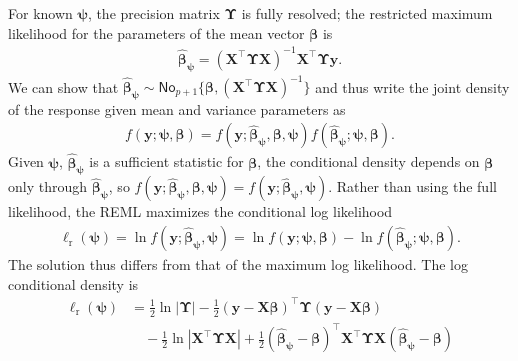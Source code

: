 \documentclass[
  11pt,
  letterpaper,
]{book}
\theoremstyle{definition}
\theoremstyle{definition}
\theoremstyle{definition}
\theoremstyle{definition}
\theoremstyle{remark}
\begin{document}
For known \(\boldsymbol{\psi}\), the precision matrix \(\boldsymbol{\Upsilon}\) is fully resolved; the restricted maximum likelihood for the parameters of the mean vector \(\boldsymbol{\beta}\) is
\begin{align*}
\widehat{\boldsymbol{\beta}}_{\boldsymbol{\psi}} = (\mathbf{X}^\top\boldsymbol{\Upsilon}\mathbf{X})^{-1}\mathbf{X}^\top\boldsymbol{\Upsilon}\boldsymbol{y}.
\end{align*}
We can show that \(\widehat{\boldsymbol{\beta}}_{\boldsymbol{\psi}} \sim \mathsf{No}_{p+1}\{\boldsymbol{\beta}, (\mathbf{X}^\top\boldsymbol{\Upsilon}\mathbf{X})^{-1}\}\) and thus write the joint density of the response given mean and variance parameters as
\begin{align*}
f(\boldsymbol{y}; \boldsymbol{\psi}, \boldsymbol{\beta}) = f(\boldsymbol{y}; \widehat{\boldsymbol{\beta}}_{\boldsymbol{\psi}}, \boldsymbol{\beta}, \boldsymbol{\psi}) f(\widehat{\boldsymbol{\beta}}_{\boldsymbol{\psi}}; \boldsymbol{\psi}, \boldsymbol{\beta}).
\end{align*}
Given \(\boldsymbol{\psi}\), \(\widehat{\boldsymbol{\beta}}_{\boldsymbol{\psi}}\) is a sufficient statistic for \(\boldsymbol{\beta}\), the conditional density depends on \(\boldsymbol{\beta}\) only through \(\widehat{\boldsymbol{\beta}}_{\boldsymbol{\psi}}\), so \(f(\boldsymbol{y}; \widehat{\boldsymbol{\beta}}_{\boldsymbol{\psi}}, \boldsymbol{\beta}, \boldsymbol{\psi}) = f(\boldsymbol{y}; \widehat{\boldsymbol{\beta}}_{\boldsymbol{\psi}}, \boldsymbol{\psi})\).
Rather than using the full likelihood, the REML maximizes the conditional log likelihood
\begin{align*}
\ell_{\mathrm{r}}(\boldsymbol{\psi})= \ln f(\boldsymbol{y}; \widehat{\boldsymbol{\beta}}_{\boldsymbol{\psi}},  \boldsymbol{\psi}) = \ln f(\boldsymbol{y}; \boldsymbol{\psi}, \boldsymbol{\beta}) - \ln f(\widehat{\boldsymbol{\beta}}_{\boldsymbol{\psi}}; \boldsymbol{\psi}, \boldsymbol{\beta}).
\end{align*}
The solution thus differs from that of the maximum log likelihood. The log conditional density is
\begin{align*}
\ell_{\mathrm{r}}(\boldsymbol{\psi})
 &= \frac{1}{2} \ln |\boldsymbol{\Upsilon}| - \frac{1}{2} (\boldsymbol{y}-\mathbf{X}\boldsymbol{\beta})^\top\boldsymbol{\Upsilon}(\boldsymbol{y}-\mathbf{X}\boldsymbol{\beta})
 \\& \quad - \frac{1}{2} \ln \left|\mathbf{X}^\top\boldsymbol{\Upsilon}\mathbf{X}\right| + \frac{1}{2} \left(\widehat{\boldsymbol{\beta}}_{\boldsymbol{\psi}}-\boldsymbol{\beta}\right)^\top \mathbf{X}^\top\boldsymbol{\Upsilon}\mathbf{X} \left(\widehat{\boldsymbol{\beta}}_{\boldsymbol{\psi}}-\boldsymbol{\beta}\right)
\end{align*}
\end{document}
